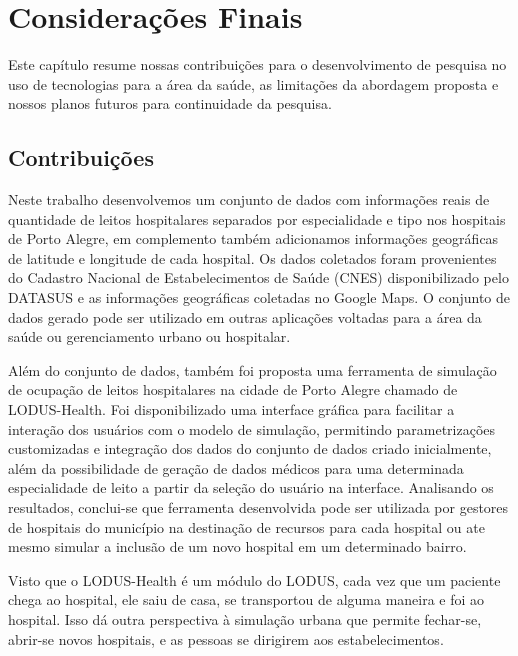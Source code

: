 \chapter{Considerações Finais} \label{cpt:discus}
Este capítulo resume nossas contribuições para o desenvolvimento de pesquisa no uso de tecnologias para a área da saúde, as limitações da abordagem proposta e nossos planos futuros para continuidade da pesquisa.

\section{Contribuições}
Neste trabalho desenvolvemos um conjunto de dados com informações reais de quantidade de leitos hospitalares separados por especialidade e tipo nos hospitais de Porto Alegre, em complemento também adicionamos informações geográficas de latitude e longitude de cada hospital. Os dados coletados foram provenientes do Cadastro Nacional de Estabelecimentos de Saúde (CNES) disponibilizado pelo DATASUS e as informações geográficas coletadas no Google Maps. O conjunto de dados gerado pode ser utilizado em outras aplicações voltadas para a área da saúde ou gerenciamento urbano ou hospitalar. 

Além do conjunto de dados, também foi proposta uma ferramenta de simulação de ocupação de leitos hospitalares na cidade de Porto Alegre chamado de LODUS-Health. Foi disponibilizado uma interface gráfica para facilitar a interação dos usuários com o modelo de simulação, permitindo parametrizações customizadas e integração dos dados do conjunto de dados criado inicialmente, além da possibilidade de geração de dados médicos para uma determinada especialidade de leito a partir da seleção do usuário na interface. Analisando os resultados, conclui-se que ferramenta desenvolvida pode ser utilizada por gestores de hospitais do município na destinação de recursos para cada hospital ou ate mesmo simular a inclusão de um novo hospital em um determinado bairro.

Visto que o LODUS-Health é um módulo do LODUS, cada vez que um paciente chega ao hospital, ele saiu de casa, se transportou de alguma maneira e foi ao hospital. Isso dá outra perspectiva à simulação urbana que permite fechar-se, abrir-se novos hospitais, e as pessoas se dirigirem aos estabelecimentos.

